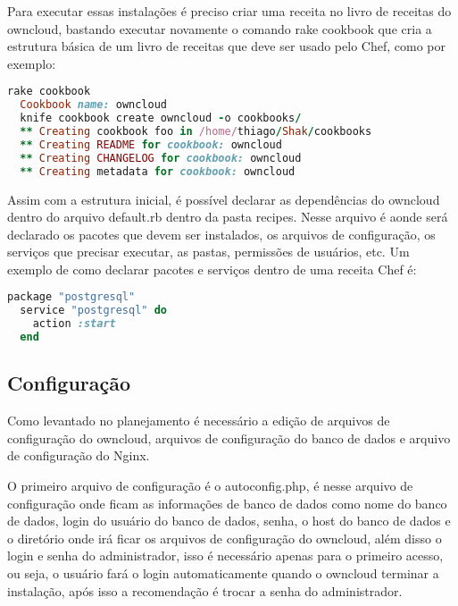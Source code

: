 Para executar essas instalações é preciso criar uma receita no livro de receitas
do owncloud, bastando executar novamente o comando rake cookbook que cria a estrutura básica
de um livro de receitas que deve ser usado pelo Chef, como por exemplo:

\begin{lstlisting}[language=Ruby,label=dice_index,caption={Exemplo de criação de estrutura básica de livro de receitas do owncloud com shak}]
  rake cookbook
  Cookbook name: owncloud
  knife cookbook create owncloud -o cookbooks/
  ** Creating cookbook foo in /home/thiago/Shak/cookbooks
  ** Creating README for cookbook: owncloud
  ** Creating CHANGELOG for cookbook: owncloud
  ** Creating metadata for cookbook: owncloud
\end{lstlisting}

Assim com a estrutura inicial, é possível declarar as dependências do owncloud
dentro do arquivo default.rb dentro da pasta recipes. Nesse arquivo é aonde
será declarado os pacotes que devem ser instalados, os arquivos de configuração,
os serviços que precisar executar, as pastas, permissões de usuários, etc. Um exemplo
de como declarar pacotes e serviços dentro de uma receita Chef é:

\begin{lstlisting}[language=Ruby,label=dice_index,caption={Exemplo de como habilitar serviço do postgresql com chef}]
  package "postgresql"
  service "postgresql" do
    action :start
  end
\end{lstlisting}

\subsection{Configuração}

Como levantado no planejamento é necessário a edição de arquivos de configuração
do owncloud, arquivos de configuração do banco de dados e arquivo de configuração
do Nginx.

O primeiro arquivo de configuração é o autoconfig.php, é nesse arquivo de
configuração onde ficam as informações de banco de dados como nome do banco de dados,
login do usuário do banco de dados, senha, o host do banco de dados e o diretório
onde irá ficar os arquivos de configuração do owncloud, além disso o login e senha
do administrador, isso é necessário apenas para o primeiro acesso, ou seja, o usuário
fará o login automaticamente quando o owncloud terminar a instalação, após isso
a recomendação é trocar a senha do administrador.

